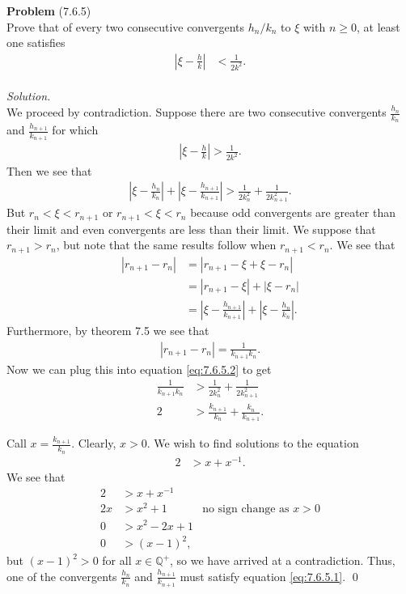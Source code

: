 \documentclass[12 pt]{amsart}
\begin{document}
\phantom{\quad} \vfill
\noindent
\textbf{Problem} (7.6.5) \\[4ex]
  Prove that of every two consecutive convergents
  $h_n/k_n$ to $\xi$ with $n \geq 0$, at least one
  satisfies
  \begin{align}
    \label{eq:7.6.5.1}
    \left| \xi - \frac{h}{k} \right| &< \frac{1}{2k^2}.
  \end{align}
  \\[2ex]
\emph{Solution.} \\[2ex]
  We proceed by contradiction.
  Suppose there are two consecutive convergents
  $\frac{h_n}{k_n}$
  and 
  $\frac{h_{n+1}}{k_{n+1}}$
  for which
  \begin{align*}
    \left| \xi - \frac{h}{k} \right| > \frac{1}{2k^2}.
  \end{align*}
  Then we see that 
  \begin{align}
    \label{eq:7.6.5.2}
    \left| \xi - \frac{h_n}{k_n} \right| 
    +  
    \left| \xi - \frac{h_{n+1}}{k_{n+1}} \right| 
    > 
    \frac{1}{2k_n^2}
    +
    \frac{1}{2k_{n+1}^2}.
  \end{align}
  But $r_n < \xi < r_{n+1}$ or $r_{n+1} < \xi < r_n$ because
  odd convergents are greater than their limit and even
  convergents are less than their limit.
  We suppose that $r_{n+1} > r_n$, but note that the 
  same results follow when $r_{n+1} < r_n$. 
  We see that 
  \begin{align*}
    \left| r_{n+1} - r_n \right|
    &=
      \left| r_{n+1} - \xi + \xi - r_n \right| \\
    &=
      \left| r_{n+1} - \xi \right| + \left| \xi - r_n \right| \\
    &=
      \left| \xi - \frac{h_{n+1}}{k_{n+1}} \right| 
      + \left| \xi - \frac{h_{n}}{k_{n}} \right|.
  \end{align*}
  Furthermore, by theorem 7.5 we see that 
  \begin{align*}
    | r_{n+1} - r_n | = \frac{1}{k_{n+1} k_n}.
  \end{align*}
  Now we can plug this into equation \ref{eq:7.6.5.2} to get
  \begin{align*}
    \frac{1}{k_{n+1} k_n}
    &> 
      \frac{1}{2k_n^2}
      +
      \frac{1}{2k_{n+1}^2} \\
    2
    &> 
      \frac{k_{n+1}}{k_n} + \frac{k_n}{k_{n+1}}.
  \end{align*}

  Call $x = \frac{k_{n+1}}{k_n}$. 
  Clearly, $x > 0$.
  We wish to find solutions to the equation
  \begin{align*}
    2 &> x + x^{-1}.
  \end{align*}
  We see that 
  \begin{align*}
    2 &> x + x^{-1} \\
    2x &> x^2 + 1 & \text{no sign change as $x > 0$} \\
    0 &> x^2 - 2x + 1 \\
    0 &> (x-1)^2,
  \end{align*}
  but $(x-1)^2 > 0$ for all $x \in \mathbb{Q}^+$, so we 
  have arrived at a contradiction.
  Thus, one of the convergents
  $\frac{h_n}{k_n}$
  and 
  $\frac{h_{n+1}}{k_{n+1}}$
  must satisfy equation
  \ref{eq:7.6.5.1}.
\vfill
\qed
\end{document}
